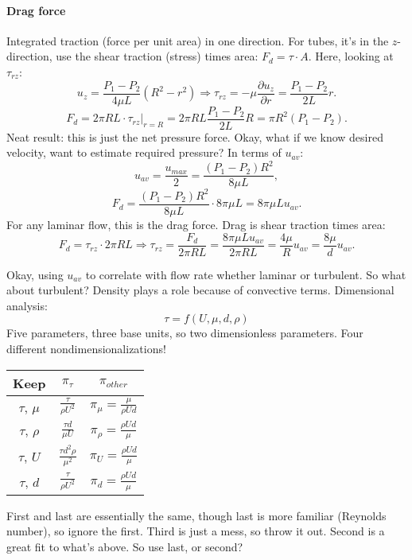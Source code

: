 \documentclass{report}
\begin{document}
\paragraph{Drag force}

Integrated traction (force per unit area) in one direction.  For tubes, it's in
the $z$-direction, use the shear traction (stress) times area: $F_d = \tau\cdot
A$.  Here, looking at $\tau_{rz}$:
$$u_z = \frac{P_1-P_2}{4\mu L}(R^2-r^2) \Rightarrow
\tau_{rz} = -\mu\frac{\partial u_z}{\partial r} = \frac{P_1-P_2}{2 L} r.$$
$$F_d = 2\pi RL\cdot\left.\tau_{rz}\right|_{r=R} =
2\pi RL \frac{P_1-P_2}{2 L} R = \pi R^2(P_1-P_2).$$
Neat result: this is just the net pressure force.  Okay, what if we know
desired velocity, want to estimate required pressure?  In terms of $u_{av}$:
$$u_{av} = \frac{u_{max}}{2} = \frac{(P_1-P_2)R^2}{8\mu L},$$
$$F_d = \frac{(P_1-P_2)R^2}{8\mu L}\cdot 8\pi\mu L = 8\pi\mu L u_{av}.$$
For any laminar flow, this is the drag force.  Drag is shear traction times
area:
$$F_d = \tau_{rz}\cdot 2\pi RL \Rightarrow \tau_{rz} = \frac{F_d}{2\pi RL} =
\frac{8\pi\mu L u_{av}}{2\pi RL} = \frac{4\mu}{R}u_{av} =
\frac{8\mu}{d}u_{av}.$$

Okay, using $u_{av}$ to correlate with flow rate whether laminar or turbulent.
So what about turbulent?  Density plays a role because of convective terms.
Dimensional analysis:
$$\tau = f(U, \mu, d, \rho)$$
Five parameters, three base units, so two dimensionless parameters.  Four
different nondimensionalizations!
\begin{center}
  \begin{tabular}[h]{c|cc|}
    Keep           & $\pi_\tau$ & $\pi_{other}$ \\ \hline
    $\tau$, $\mu$ & $\frac{\tau}{\rho U^2}$ & $\pi_\mu=\frac{\mu}{\rho Ud}$ \\
    $\tau$, $\rho$ & $\frac{\tau d}{\mu U}$ & $\pi_\rho=\frac{\rho Ud}{\mu}$ \\
    $\tau$, $U$ & $\frac{\tau d^2\rho}{\mu^2}$ & $\pi_U=\frac{\rho Ud}{\mu}$ \\
    $\tau$, $d$ & $\frac{\tau}{\rho U^2}$ & $\pi_d=\frac{\rho Ud}{\mu}$ \\
    \hline
  \end{tabular}
\end{center}
First and last are essentially the same, though last is more familiar (Reynolds
number), so ignore the first.  Third is just a mess, so throw it out.  Second
is a great fit to what's above.  So use last, or second?
\end{document}
